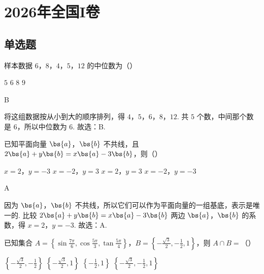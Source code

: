 \documentclass[UTF8,a4paper,oneside,11pt]{ctexbook}
\begin{document}
\mainmatter

\chapter{2026年全国I卷}

\section{单选题}

\begin{problem}
样本数据 \(6\)，\(8\)，\(4\)，\(5\)，\(12\) 的中位数为（\quad）

\choices
    {\(5\)}
    {\(6\)}
    {\(8\)}
    {\(9\)}
\end{problem}

\begin{answer}
B
\end{answer}

\begin{solution}
将这组数据按从小到大的顺序排列，得 \(4\)，\(5\)，\(6\)，\(8\)，\(12\). 共 \(5\) 个数，中间那个数是 \(6\)，所以中位数为 \(6\). 故选：B.
\end{solution}

\begin{problem}
已知平面向量 \(\bs{a}\)，\(\bs{b}\) 不共线，且 \(2\bs{a}+y\bs{b}=x\bs{a}-3\bs{b}\)，则（\quad）

\choices
    {\(x=2\)，\(y=-3\)}
    {\(x=-2\)，\(y=3\)}
    {\(x=2\)，\(y=3\)}
    {\(x=-2\)，\(y=-3\)}
\end{problem}

\begin{answer}
A
\end{answer}

\begin{solution}
因为 \(\bs{a}\)，\(\bs{b}\) 不共线，所以它们可以作为平面向量的一组基底，表示是唯一的. 比较
\(2\bs{a}+y\bs{b}=x\bs{a}-3\bs{b}\)
两边 \(\bs{a}\)，\(\bs{b}\) 的系数，得
\(x=2\)，\(y=-3\).
故选：A.
\end{solution}

\begin{problem}
已知集合 \(A=\left\{ \sin \frac{7\pi}{6},\cos \frac{5\pi}{3},\tan \frac{5\pi}{4} \right\}\)，\(B=\left\{ -\frac{\sqrt{3}}{2},-\frac{1}{2},1 \right\}\)，则 \(A\cap B=\)（\quad）

\choices
    {\(\left\{ -\frac{\sqrt{3}}{2},-\frac{1}{2} \right\}\)}
    {\(\left\{ -\frac{\sqrt{3}}{2},1 \right\}\)}
    {\(\left\{ -\frac{1}{2},1 \right\}\)}
    {\(\left\{ -\frac{\sqrt{3}}{2},-\frac{1}{2},1 \right\}\)}
\end{problem}
\end{document}
